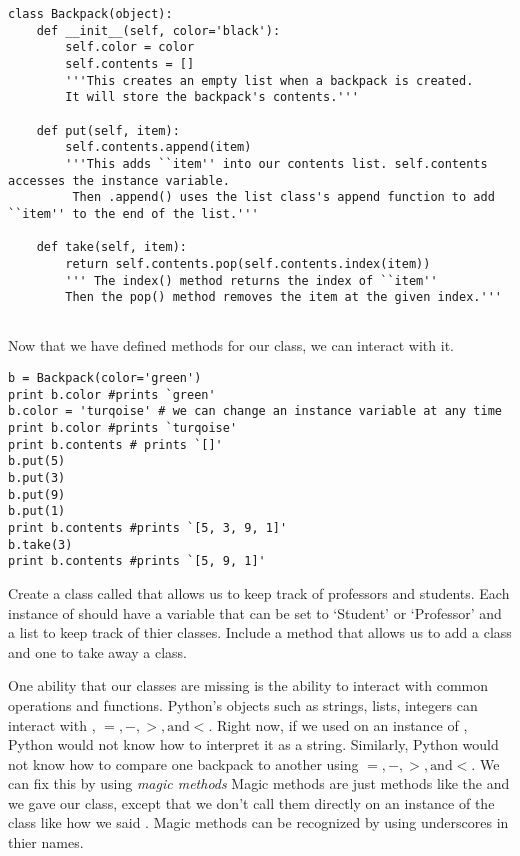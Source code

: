 \begin{lstlisting}
class Backpack(object):
    def __init__(self, color='black'):
        self.color = color
        self.contents = []
        '''This creates an empty list when a backpack is created. 
        It will store the backpack's contents.'''
        
    def put(self, item):
        self.contents.append(item) 
        '''This adds ``item'' into our contents list. self.contents accesses the instance variable.
         Then .append() uses the list class's append function to add ``item'' to the end of the list.'''
        
    def take(self, item):
        return self.contents.pop(self.contents.index(item)) 
        ''' The index() method returns the index of ``item''
        Then the pop() method removes the item at the given index.'''
        
\end{lstlisting}

Now that we have defined methods for our  class, we can interact with it.


\begin{lstlisting}
b = Backpack(color='green')
print b.color #prints `green'
b.color = 'turqoise' # we can change an instance variable at any time
print b.color #prints `turqoise'
print b.contents # prints `[]'
b.put(5)
b.put(3)
b.put(9)
b.put(1)
print b.contents #prints `[5, 3, 9, 1]'
b.take(3)
print b.contents #prints `[5, 9, 1]'
\end{lstlisting}

\begin{problem}
Create a class called  that allows us to keep track of professors and students.
Each instance of  should have a variable that can be set to `Student' or `Professor' and a list to keep track of thier classes.
Include a method that allows us to add a class and one to take away a class.
\label{School}
\end{problem}

One ability that our classes are missing is the ability to interact with common operations and functions.
Python's objects such as strings, lists, integers can interact with ,  $ =, - , >, \text{and} <$.
Right now, if we used  on an instance of , Python would not know how to interpret it as a string.
Similarly, Python would not know how to compare one backpack to another using $ =, - , >, \text{and} <$.
We can fix this by using \emph{magic methods}
Magic methods are just methods like the  and  we gave our  class, except that we don't call them directly on an instance of the class like how we said .
Magic methods can be recognized by using underscores in thier names.

